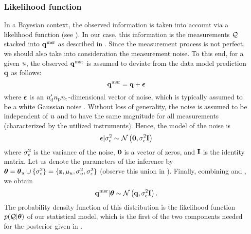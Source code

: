 \subsubsection{Likelihood function}
In a Bayesian context, the observed information is taken into account via a likelihood function (see ).
In our case, this information is the measurements $\mathcal{Q}$ stacked into $\mathbf{q}^{\text{msr}}$ as described in .
Since the measurement process is not perfect, we should also take into consideration the measurement noise.
To this end, for a given $u$, the observed $\mathbf{q}^{\text{msr}}$ is assumed to deviate from the data model prediction $\mathbf{q}$ as follows:
\begin{equation} \elabel{noisy-measurements}
  \vq^\meas = \vq + \vnoise
\end{equation}
where $\boldsymbol\epsilon$ is an ${n_\text{d}'} {n_\text{p}} {n_\text{t}}$-dimensional vector of noise, which is typically assumed to be a white Gaussian noise \cite{rasmussen2006, marzouk2009}.
Without loss of generality, the noise is assumed to be independent of $u$ and to have the same magnitude for all measurements (characterized by the utilized instruments).
Hence, the model of the noise is
\begin{equation} \elabel{noise-model}
  \vnoise | \sigma^2_\noise \sim \gaussian{\vZero}{\sigma^2_\noise \mOne}
\end{equation}
where $\sigma^2_\epsilon$ is the variance of the noise, $\mathbf{0}$ is a vector of zeros, and $\mathbf{I}$ is the identity matrix.
Let us denote the parameters of the inference by ${\boldsymbol\theta} = {\boldsymbol\theta}_u \cup \{ \sigma_\epsilon^2 \} = \{ \mathbf{z}, \mu_u, \sigma_u^2, \sigma_\epsilon^2 \}$ (observe this union in ).
Finally, combining  and , we obtain
\begin{equation} \elabel{likelihood}
  \vq^\meas | \vparam \sim \gaussian{\vq}{\sigma_\noise^2 \mOne}.
\end{equation}
The probability density function of this distribution is the likelihood function $\f{\QData | \vparam}$ of our statistical model, which is the first of the two components needed for the posterior given in .

